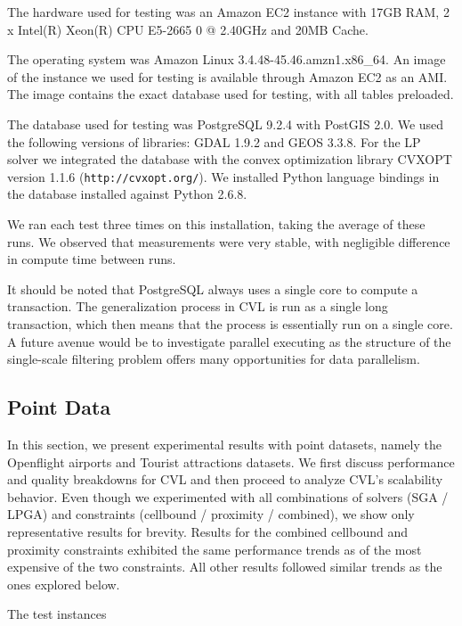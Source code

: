 The hardware used for testing was an Amazon EC2 instance with 17GB RAM, 2 x Intel(R) Xeon(R) CPU E5-2665 0 @ 2.40GHz and 20MB Cache. 

The operating system was Amazon Linux 3.4.48-45.46.amzn1.x86\_64. An image of the instance we used for testing is available through Amazon EC2 as an AMI. The image contains the exact database used for testing, with all tables preloaded.

The database used for testing was PostgreSQL 9.2.4 with PostGIS  2.0. We used the following versions of libraries: GDAL 1.9.2 and GEOS 3.3.8. For the LP solver we integrated the database with the convex optimization library CVXOPT version 1.1.6 (\texttt{http://cvxopt.org/}). We installed Python language bindings in the database installed against Python 2.6.8.

We ran each test three times on this installation, taking the average of these runs. We observed that measurements were very stable, with negligible difference in compute time between runs.

It should be noted that PostgreSQL always uses a single core to compute a transaction. The generalization process in CVL is run as a single long transaction, which then means that the process is essentially run on a single core. A future avenue would be to investigate parallel executing as the structure of the single-scale filtering problem offers many opportunities for data parallelism.

\subsection{Point Data}
\label{sec:exp:points}

In this section, we present experimental results with point datasets, namely the Openflight airports and Tourist attractions datasets. We first discuss performance and quality breakdowns for CVL and then proceed to analyze CVL's scalability behavior. Even though we experimented with all combinations of solvers (SGA / LPGA) and constraints (cellbound / proximity / combined), we show only representative results for brevity. Results for the combined cellbound and proximity constraints exhibited the same performance trends as of the most expensive of the two constraints. All other results followed similar trends as the ones explored below.    

The test instances

